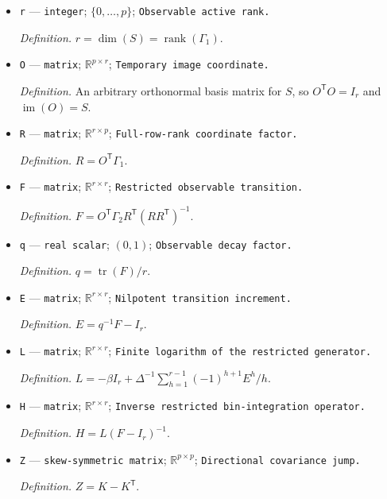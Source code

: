 \documentclass{article}
\begin{document}
\begin{itemize}
  \par\smallskip\noindent\emph{Definition.} \(S=\operatorname{im}(\Gamma_1)\).
  \item \texttt{r} --- \texttt{integer}; \(\{0,\ldots,p\}\); \texttt{Observable active rank.}
  \par\smallskip\noindent\emph{Definition.} \(r=\dim(S)=\operatorname{rank}(\Gamma_1)\).
  \item \texttt{O} --- \texttt{matrix}; \(\mathbb R^{p\times r}\); \texttt{Temporary image coordinate.}
  \par\smallskip\noindent\emph{Definition.} An arbitrary orthonormal basis matrix for \(S\), so \(O^{\mathsf T}O=I_r\) and \(\operatorname{im}(O)=S\).
  \item \texttt{R} --- \texttt{matrix}; \(\mathbb R^{r\times p}\); \texttt{Full-\allowbreak{}row-\allowbreak{}rank coordinate factor.}
  \par\smallskip\noindent\emph{Definition.} \(R=O^{\mathsf T}\Gamma_1\).
  \item \texttt{F} --- \texttt{matrix}; \(\mathbb R^{r\times r}\); \texttt{Restricted observable transition.}
  \par\smallskip\noindent\emph{Definition.} \(F=O^{\mathsf T}\Gamma_2R^{\mathsf T}(RR^{\mathsf T})^{-1}\).
  \item \texttt{q} --- \texttt{real scalar}; \((0,1)\); \texttt{Observable decay factor.}
  \par\smallskip\noindent\emph{Definition.} \(q=\operatorname{tr}(F)/r\).
  \item \texttt{E} --- \texttt{matrix}; \(\mathbb R^{r\times r}\); \texttt{Nilpotent transition increment.}
  \par\smallskip\noindent\emph{Definition.} \(E=q^{-1}F-I_r\).
  \item \texttt{L} --- \texttt{matrix}; \(\mathbb R^{r\times r}\); \texttt{Finite logarithm of the restricted generator.}
  \par\smallskip\noindent\emph{Definition.} \(L=-\beta I_r+\Delta^{-1}\sum_{h=1}^{r-1}(-1)^{h+1}E^h/h\).
  \item \texttt{H} --- \texttt{matrix}; \(\mathbb R^{r\times r}\); \texttt{Inverse restricted bin-\allowbreak{}integration operator.}
  \par\smallskip\noindent\emph{Definition.} \(H=L(F-I_r)^{-1}\).
  \item \texttt{Z} --- \texttt{skew-\allowbreak{}symmetric matrix}; \(\mathbb R^{p\times p}\); \texttt{Directional covariance jump.}
  \par\smallskip\noindent\emph{Definition.} \(Z=K-K^{\mathsf T}\).

\end{itemize}
\end{document}
